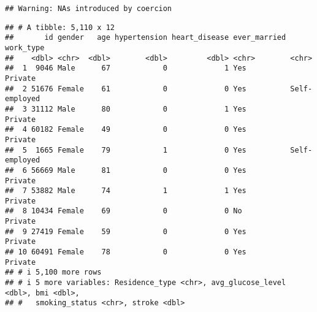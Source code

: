 \documentclass[
]{article}
\newenvironment{Shaded}{\begin{snugshade}}{\end{snugshade}}
\newcommand{\AttributeTok}[1]{\textcolor[rgb]{0.13,0.29,0.53}{#1}}
\newcommand{\CommentTok}[1]{\textcolor[rgb]{0.56,0.35,0.01}{\textit{#1}}}
\newcommand{\ConstantTok}[1]{\textcolor[rgb]{0.56,0.35,0.01}{#1}}
\newcommand{\FunctionTok}[1]{\textcolor[rgb]{0.13,0.29,0.53}{\textbf{#1}}}
\newcommand{\NormalTok}[1]{#1}
\newcommand{\OtherTok}[1]{\textcolor[rgb]{0.56,0.35,0.01}{#1}}
\newcommand{\SpecialCharTok}[1]{\textcolor[rgb]{0.81,0.36,0.00}{\textbf{#1}}}
\begin{document}
\begin{Shaded}
\end{Shaded}

\begin{verbatim}
## Warning: NAs introduced by coercion
\end{verbatim}

\begin{Shaded}
\end{Shaded}

\begin{verbatim}
## # A tibble: 5,110 x 12
##       id gender   age hypertension heart_disease ever_married work_type    
##    <dbl> <chr>  <dbl>        <dbl>         <dbl> <chr>        <chr>        
##  1  9046 Male      67            0             1 Yes          Private      
##  2 51676 Female    61            0             0 Yes          Self-employed
##  3 31112 Male      80            0             1 Yes          Private      
##  4 60182 Female    49            0             0 Yes          Private      
##  5  1665 Female    79            1             0 Yes          Self-employed
##  6 56669 Male      81            0             0 Yes          Private      
##  7 53882 Male      74            1             1 Yes          Private      
##  8 10434 Female    69            0             0 No           Private      
##  9 27419 Female    59            0             0 Yes          Private      
## 10 60491 Female    78            0             0 Yes          Private      
## # i 5,100 more rows
## # i 5 more variables: Residence_type <chr>, avg_glucose_level <dbl>, bmi <dbl>,
## #   smoking_status <chr>, stroke <dbl>
\end{verbatim}
\end{document}
